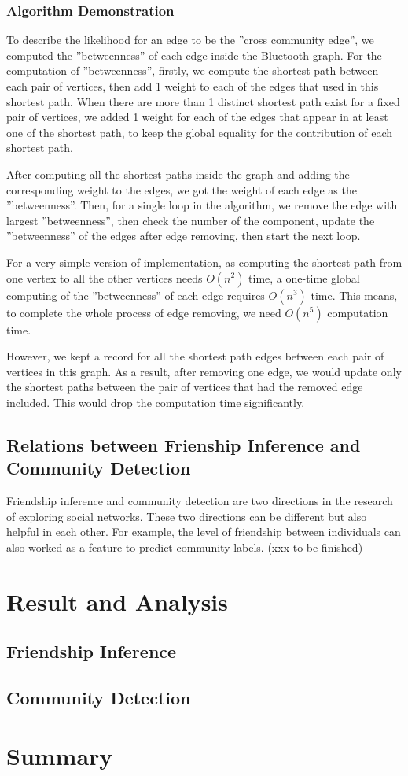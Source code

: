 \documentclass[11pt]{article}
\begin{document}
\subsubsection{Algorithm Demonstration} 
To describe the likelihood for an edge to be the ''cross community edge'', we computed the ''betweenness'' of each edge inside the Bluetooth graph. For the computation of ''betweenness'', firstly, we compute the shortest path between each pair of vertices, then add 1 weight to each of the edges that used in this shortest path. When there are more than 1 distinct shortest path exist for a fixed pair of vertices, we added 1 weight for each of the edges that appear in at least one of the shortest path, to keep the global equality for the contribution of each shortest path.

After computing all the shortest paths inside the graph and adding the corresponding weight to the edges, we got the weight of each edge as the ''betweenness''. Then, for a single loop in the algorithm, we remove the edge with largest ''betweenness'', then check the number of the component, update the ''betweenness'' of the edges after edge removing, then start the next loop.

For a very simple version of implementation, as computing the shortest path from one vertex to all the other vertices needs \(O(n^2)\) time, a one-time global computing of the ''betweenness'' of each edge requires \(O(n^3)\) time. This means, to complete the whole process of edge removing, we need \(O(n^5)\) computation time.

However, we kept a record for all the shortest path edges between each pair of vertices in this graph. As a result, after removing one edge, we would update only the shortest paths between the pair of vertices that had the removed edge included. This would drop the computation time significantly.  
\subsection{Relations between Frienship Inference and Community Detection}
Friendship inference and community detection are two directions in the research of exploring social networks. These two directions can be different but also helpful in each other. For example, the level of friendship between individuals can also worked as a feature to predict community labels. (xxx to be finished)

\section{Result and Analysis} \label{result}
\subsection{Friendship Inference}

\subsection{Community Detection}

\section{Summary}\label{summary}



%

\end{document}
